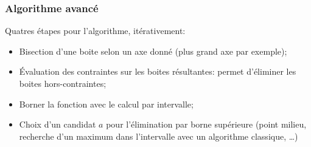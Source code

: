 \documentclass{beamer}
\begin{document}
\begin{frame}

\end{frame}

\begin{frame}
    \frametitle{Algorithme avancé}

    Quatres étapes pour l'algorithme, itérativement:
    \begin{itemize}
        \item Bisection d'une boite selon un axe donné (plus grand axe par exemple);
        \item \'Evaluation des contraintes sur les boites résultantes: permet d'éliminer les boites hors-contraintes;
        \item Borner la fonction avec le calcul par intervalle;
        \item Choix d'un candidat $a$ pour l'élimination par borne supérieure (point milieu, recherche d'un maximum dans l'intervalle avec un algorithme classique, \dots)
    \end{itemize}
\end{frame}
\end{document}
